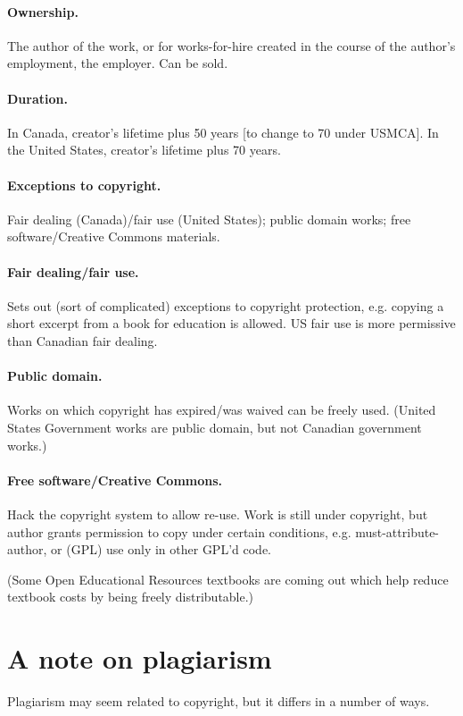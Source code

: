\documentclass[11pt]{article}
\begin{document}
\paragraph{Ownership.} The author of the work, or for works-for-hire created in the
course of the author's employment, the employer. Can be sold.

\paragraph{Duration.} In Canada, creator's lifetime plus 50 years [to change to 70 under USMCA]. In the United States, creator's
lifetime plus 70 years.

\paragraph{Exceptions to copyright.} Fair dealing (Canada)/fair use (United States); public domain works; free software/Creative Commons materials.

\paragraph{Fair dealing/fair use.} Sets out (sort of complicated) exceptions to copyright protection, e.g. copying a short excerpt from a book for education is allowed. US fair use is more permissive than Canadian fair dealing.

\paragraph{Public domain.} Works on which copyright has expired/was waived can be freely used. (United States Government works are public domain, but not Canadian government works.)

\paragraph{Free software/Creative Commons.} Hack the copyright system to allow re-use. Work is still under copyright, but author grants permission to copy under certain conditions, e.g. must-attribute-author, or (GPL) use only in other GPL'd code.

\noindent (Some Open Educational Resources textbooks are coming out which help reduce textbook costs by being freely distributable.)

\section*{A note on plagiarism}
Plagiarism may seem related to copyright, but it differs in a number of ways.
\end{document}
